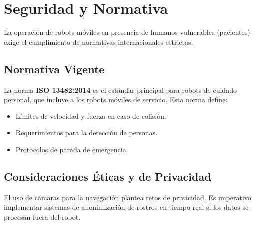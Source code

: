 \section{Seguridad y Normativa}
La operación de robots móviles en presencia de humanos vulnerables (pacientes) exige el cumplimiento de normativas internacionales estrictas.

\subsection{Normativa Vigente}
La norma \textbf{ISO 13482:2014} es el estándar principal para robots de cuidado personal, que incluye a los robots móviles de servicio. Esta norma define:
\begin{itemize}
    \item Límites de velocidad y fuerza en caso de colisión.
    \item Requerimientos para la detección de personas.
    \item Protocolos de parada de emergencia.
\end{itemize}

\subsection{Consideraciones Éticas y de Privacidad}
El uso de cámaras para la navegación plantea retos de privacidad. Es imperativo implementar sistemas de anonimización de rostros en tiempo real si los datos se procesan fuera del robot.
